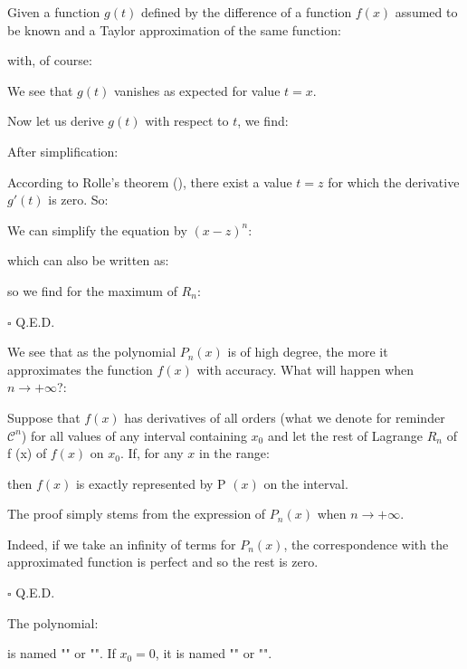 	\begin{dem}
	Given a function $g(t)$ defined by the difference of a function $f(x)$ assumed to be known and a Taylor approximation of the same function:
	
	with, of course:
	
	We see that $g (t)$ vanishes as expected for value $t=x$.
	
	Now let us derive $g(t)$ with respect to $t$, we find:
	
	After simplification:
	
	According to Rolle's theorem (), there exist a value $t=z$ for which the derivative $g'(t)$ is zero. So:
	
	We can simplify the equation by $(x-z)^n$:
	
	which can also be written as:
	
	so we find for the maximum of $R_n$:
	
	\begin{flushright}
		$\square$  Q.E.D.
	\end{flushright}
	\end{dem}
	We see that as the polynomial $P_n(x)$ is of high degree, the more it approximates the function $f (x)$ with accuracy. What will happen when $n\rightarrow +\infty$?:
	
	Suppose that $f (x)$ has derivatives of all orders (what we denote for reminder $\mathcal{C}^n$) for all values of any interval containing $x_0$ and let the rest of Lagrange $R_n$ of f (x) of $f(x)$ on $x_0$. If, for any $x$ in the range:
	
	then $f (x)$ is exactly represented by P $(x)$ on the interval.
	\begin{dem}
	The proof simply stems from the expression of $P_n(x)$ when $n\rightarrow +\infty$.
	
	Indeed, if we take an infinity of terms for $P_n(x)$, the correspondence with the approximated function is perfect and so the rest is zero.
	\begin{flushright}
		$\square$  Q.E.D.
	\end{flushright}
	\end{dem}
	The polynomial:
	
	is named "" or "". If $x_0=0$, it is named "" or "".
	
